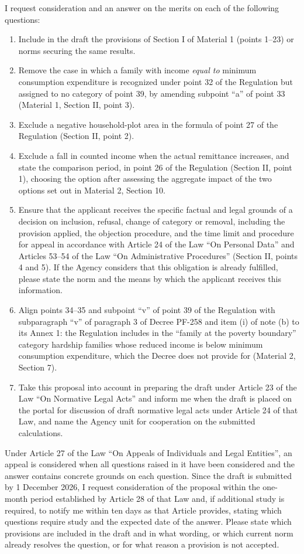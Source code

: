 \documentclass[14pt,a4paper]{extarticle}
\begin{document}
I request consideration and an answer on the merits on each of the following questions:
\begin{enumerate}[leftmargin=1.27cm,label=\arabic*.]
\item Include in the draft the provisions of Section I of Material 1 (points 1–23) or norms securing the same results.
\item Remove the case in which a family with income \textit{equal to} minimum consumption expenditure is recognized under point 32 of the Regulation but assigned to no category of point 39, by amending subpoint “a” of point 33 (Material 1, Section II, point 3).
\item Exclude a negative household-plot area in the formula of point 27 of the Regulation (Section II, point 2).
\item Exclude a fall in counted income when the actual remittance increases, and state the comparison period, in point 26 of the Regulation (Section II, point 1), choosing the option after assessing the aggregate impact of the two options set out in Material 2, Section 10.
\item Ensure that the applicant receives the specific factual and legal grounds of a decision on inclusion, refusal, change of category or removal, including the provision applied, the objection procedure, and the time limit and procedure for appeal in accordance with Article 24 of the Law “On Personal Data” and Articles 53–54 of the Law “On Administrative Procedures” (Section II, points 4 and 5). If the Agency considers that this obligation is already fulfilled, please state the norm and the means by which the applicant receives this information.
\item Align points 34–35 and subpoint “v” of point 39 of the Regulation with subparagraph “v” of paragraph 3 of Decree PF-258 and item (i) of note (b) to its Annex 1: the Regulation includes in the “family at the poverty boundary” category hardship families whose reduced income is below minimum consumption expenditure, which the Decree does not provide for (Material 2, Section 7).
\item Take this proposal into account in preparing the draft under Article 23 of the Law “On Normative Legal Acts” and inform me when the draft is placed on the portal for discussion of draft normative legal acts under Article 24 of that Law, and name the Agency unit for cooperation on the submitted calculations.
\end{enumerate}

Under Article 27 of the Law “On Appeals of Individuals and Legal Entities”, an appeal is considered when all questions raised in it have been considered and the answer contains concrete grounds on each question. Since the draft is submitted by 1 December 2026, I request consideration of the proposal within the one-month period established by Article 28 of that Law and, if additional study is required, to notify me within ten days as that Article provides, stating which questions require study and the expected date of the answer. Please state which provisions are included in the draft and in what wording, or which current norm already resolves the question, or for what reason a provision is not accepted.
\end{document}
